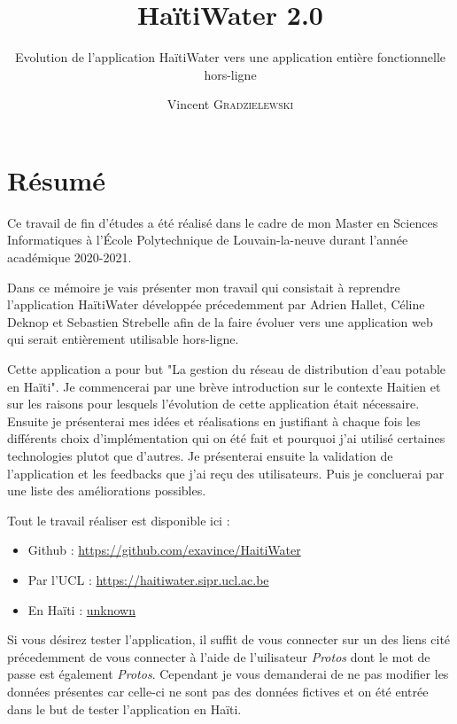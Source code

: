 \documentclass{EPL-master-thesis-covers-FR}
\title{HaïtiWater 2.0}
\subtitle{Evolution de l'application HaïtiWater vers une application entière  fonctionnelle hors-ligne}
\author{Vincent \textsc{Gradzielewski}}%
\begin{document}
	\maketitle
	\tableofcontents

	\setlength{\parskip}{1.5em plus1em minus1em}


	\chapter*{Résumé}
	
		Ce travail de fin d'études a été réalisé dans le cadre de mon Master en Sciences Informatiques à l'École Polytechnique de Louvain-la-neuve durant l'année académique 2020-2021.
		
		Dans ce mémoire je vais présenter mon travail qui consistait à reprendre l'application HaïtiWater développée précedemment par Adrien Hallet, Céline Deknop et Sebastien Strebelle afin de la faire évoluer vers une application web qui serait entièrement utilisable hors-ligne.
		 
		Cette application a pour but "La gestion du réseau de distribution d'eau potable en Haïti". Je commencerai par une brève introduction sur le contexte Haitien et sur les raisons pour lesquels l'évolution de cette application était nécessaire. Ensuite je présenterai mes idées et réalisations en justifiant à chaque fois les différents choix d'implémentation qui on été fait et pourquoi j'ai utilisé certaines technologies plutot que d'autres. Je présenterai ensuite la validation de l'application et les feedbacks que j'ai reçu des utilisateurs. Puis je concluerai par une liste des améliorations possibles.

		Tout le travail réaliser est disponible ici :

\begin{itemize}
	\item Github : \url{https://github.com/exavince/HaitiWater}
	\item Par l'UCL : \url{https://haitiwater.sipr.ucl.ac.be}
	\item En Haïti : \url{unknown}
\end{itemize}		

		Si vous désirez tester l'application, il suffit de vous connecter sur un des liens cité précedemment de vous connecter à l'aide de l'uilisateur \emph{Protos} dont le mot de passe est également \emph{Protos}. Cependant je vous demanderai de ne pas modifier les données présentes car celle-ci ne sont pas des données fictives et on été entrée dans le but de tester l'application en Haïti.
		
\end{document}
